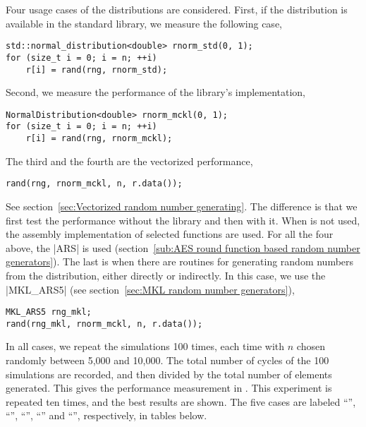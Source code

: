 Four usage cases of the distributions are considered. First, if the
distribution is available in the standard library, we measure the following
case,
\begin{verbatim}
std::normal_distribution<double> rnorm_std(0, 1);
for (size_t i = 0; i = n; ++i)
    r[i] = rand(rng, rnorm_std);
\end{verbatim}
Second, we measure the performance of the library's implementation,
\begin{verbatim}
NormalDistribution<double> rnorm_mckl(0, 1);
for (size_t i = 0; i = n; ++i)
    r[i] = rand(rng, rnorm_mckl);
\end{verbatim}
The third and the fourth are the vectorized performance,
\begin{verbatim}
rand(rng, rnorm_mckl, n, r.data());
\end{verbatim}
See section~\ref{sec:Vectorized random number generating}. The difference is
that we first test the performance without the \mkl \vml library and then with
it. When \mkl \vml is not used, the assembly implementation of selected
functions are used. For all the four above, the |ARS| \rng is used
(section~\ref{sub:AES round function based random number generators}). The last
is when there are \mkl routines for generating random numbers from the
distribution, either directly or indirectly. In this case, we use the
|MKL_ARS5| \rng (see section~\ref{sec:MKL random number generators}),
\begin{verbatim}
MKL_ARS5 rng_mkl;
rand(rng_mkl, rnorm_mckl, n, r.data());
\end{verbatim}
In all cases, we repeat the simulations 100 times, each time with $n$ chosen
randomly between 5,000 and 10,000. The total number of cycles of the 100
simulations are recorded, and then divided by the total number of elements
generated. This gives the performance measurement in \cpe. This experiment is
repeated ten times, and the best results are shown. The five cases are labeled
``\std'', ``\mckl'', ``\vmf'', ``\vml'' and ``\mkl'', respectively, in tables
below.










